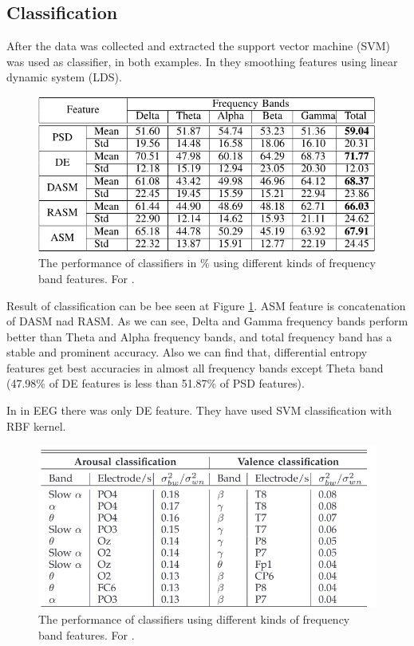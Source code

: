 \documentclass[10pt,journal,compsoc,twoside]{IEEEtran}
\newcommand{\Ref}[2]{#2 \ref{#1}}
\begin{document}
\subsection{Classification}
After the data was collected and extracted the support vector machine (SVM) was used as classifier, in both examples.
In  \cite{WeiLongBoNanBaoLiang2014} they smoothing features using linear dynamic system (LDS).

\begin{figure}[ht]
	\centering
	\includegraphics[width=1.0\linewidth]{performanceOfClassifier1}
	\caption{The performance of classifiers in \% using different kinds of frequency band features. For \cite{WeiLongBoNanBaoLiang2014}.}
	\label{fig:performanceofclassifier1}
\end{figure}
Result of classification can be bee seen at \Ref{fig:performanceofclassifier1}{Figure}. ASM feature is concatenation of DASM nad RASM. As we can see, Delta and Gamma frequency bands perform better than Theta and Alpha frequency bands, and total frequency band has a stable and  prominent  accuracy.  Also  we  can  find  that,  differential entropy features get best accuracies in almost all frequency  bands  except  Theta  band  (47.98\%  of  DE  features is  less  than  51.87\%  of  PSD  features).
\newline
\par In \cite{SoleymaniPanticPun2002} in EEG there was only DE feature. They have used SVM classification with RBF kernel.
\begin{figure}[ht]
	\centering
	\includegraphics[width=1.0\linewidth]{performanceOfClassifier2}
	\caption{The performance of classifiers using different kinds of frequency band features. For \cite{SoleymaniPanticPun2002}.}
	\label{fig:performanceofclassifier2}
\end{figure}
\end{document}

